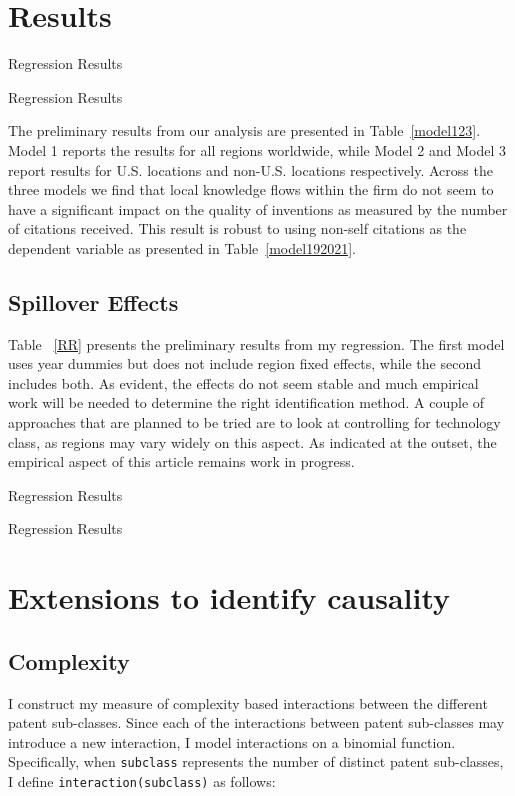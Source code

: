 \documentclass[12pt]{article}
\begin{document}
\section{Results}
\begin{table}
\caption{Regression Results}

\label{RR}
\end{table}

\begin{table}
\caption{Regression Results}

\label{RT}
\end{table}
The preliminary results from our analysis are presented in Table~\ref{model123}. Model 1 reports the results for all regions worldwide, while Model 2 and Model 3 report results for U.S. locations and non-U.S. locations respectively. Across the three models we find that local knowledge flows within the firm do not seem to have a significant impact on the quality of inventions as measured by the number of citations received. This result is robust to using non-self citations as the dependent variable as presented in Table~\ref{model192021}. \par
\subsection{Spillover Effects}
Table ~\ref{RR} presents the preliminary results from my regression. The first model uses year dummies but does not include region fixed effects, while the second includes both. As evident, the effects do not seem stable and much empirical work will be needed to determine the right identification method. A couple of approaches that are planned to be tried are to look at controlling for technology class, as regions may vary widely on this aspect. As indicated at the outset, the empirical aspect of this article remains work in progress.
\begin{table}
\caption{Regression Results}

\label{CC}
\end{table}



\begin{table}
\caption{Regression Results}

\label{CT}
\end{table}

\section{Extensions to identify causality}
\subsection{Complexity}
I construct my measure of complexity based interactions between the different patent sub-classes. Since each of the interactions between patent sub-classes may introduce a new interaction, I model interactions on a binomial function. Specifically, when \verb|subclass| represents the number of distinct patent sub-classes, I define  \verb|interaction(subclass)| as follows:
\end{document}
